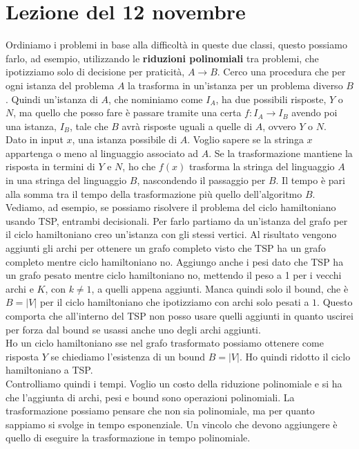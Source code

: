 \section{Lezione del 12 novembre}
Ordiniamo i problemi in base alla difficoltà in queste due classi, questo possiamo farlo, ad esempio, utilizzando le \textbf{riduzioni polinomiali} tra problemi, che ipotizziamo solo di decisione per praticità, $A\to B$. 
Cerco una procedura che per ogni istanza del problema $A$ la trasforma in un'istanza per un problema diverso $B$. 
Quindi un'istanza di $A$, che nominiamo come $I_A$, ha due possibili risposte, $Y$ o $N$, ma quello che posso fare è passare tramite una certa $f:I_A\to I_B$ avendo poi una istanza, $I_B$, tale che $B$ avrà risposte uguali a quelle di $A$, ovvero $Y$ o $N$.\\

Dato in input $x$, una istanza possibile di $A$. Voglio sapere se la stringa $x$ appartenga o meno al linguaggio associato ad $A$. Se la trasformazione mantiene la risposta in termini di $Y$ e $N$, ho che $f(x)$ trasforma la stringa del linguaggio $A$ in una stringa del linguaggio $B$, nascondendo il passaggio per $B$. Il tempo è pari alla somma tra il tempo della trasformazione più quello dell'algoritmo $B$.\\ 

Vediamo, ad esempio, se possiamo risolvere il problema del ciclo hamiltoniano usando TSP, entrambi decisionali. Per farlo partiamo da un'istanza del grafo per il ciclo hamiltoniano creo un'istanza con gli stessi vertici. Al risultato vengono aggiunti gli archi per ottenere un grafo completo visto che TSP ha un grafo completo mentre ciclo hamiltoniano no. Aggiungo anche i pesi dato che TSP ha un grafo pesato mentre ciclo hamiltoniano no, mettendo il peso a 1 per i vecchi archi e $K$, con $k\neq 1$, a quelli appena aggiunti.
Manca quindi solo il bound, che è $B=|V|$ per il ciclo hamiltoniano che ipotizziamo con archi solo pesati a $1$. Questo comporta che all'interno del TSP non posso usare quelli aggiunti in quanto uscirei per forza dal bound se usassi anche uno degli archi aggiunti.\\
Ho un ciclo hamiltoniano sse nel grafo trasformato possiamo ottenere come risposta $Y$ se chiediamo l'esistenza di un bound $B=|V|$. Ho quindi ridotto il
ciclo hamiltoniano a TSP.\\

Controlliamo quindi i tempi. Voglio un costo della riduzione polinomiale e si ha che l'aggiunta di archi, pesi e bound sono operazioni polinomiali. La trasformazione possiamo pensare che non sia polinomiale, ma per quanto sappiamo si svolge in tempo esponenziale. Un vincolo che devono aggiungere è quello di eseguire la trasformazione in tempo polinomiale.
